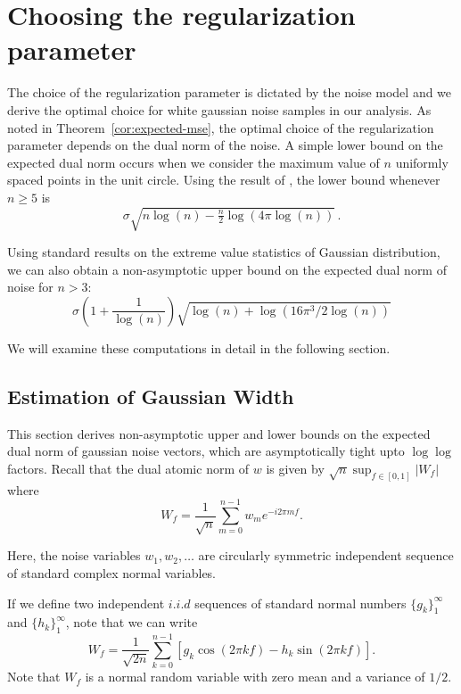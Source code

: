 \section{Choosing the regularization parameter}\label{subsec:parameter}
The choice of the regularization parameter is dictated by the noise model and we
derive the optimal choice for white gaussian noise samples in our analysis. As
noted in Theorem~\ref{cor:expected-mse}, the optimal choice of the
regularization parameter depends on the dual norm of the noise. A simple lower
bound on the expected dual norm occurs when we consider the maximum value of $n$
uniformly spaced points in the unit circle. Using the result of \cite{lr76}, the
lower bound whenever $n \geq 5$ is
\[
\sigma\sqrt{n\log(n) - \tfrac{n}{2} \log(4\pi\log(n))}\,.
\]

Using standard results on the extreme value statistics of Gaussian distribution,
we can also obtain a non-asymptotic upper bound on the expected dual norm of
noise for $n > 3$:
\[\sigma\left(1  + \frac{1}{\log(n)}\right)\sqrt{\log(n) + \log(16 \pi^3/2 \log(n))}\nonumber
\]

We will examine these computations in detail in the following section.

\subsection{Estimation of Gaussian Width}
\label{proof:dual-norm-bounds}

This section derives non-asymptotic upper and lower bounds on the expected dual norm of gaussian noise vectors, which are asymptotically tight upto $\log\log$ factors. Recall that the dual atomic norm of $w$ is given by $\sqrt{n}\sup_{f \in [0,1]}|W_f|$ where
\begin{equation*}
\label{ranproc}
W_f = \frac{1}{\sqrt{n}}\sum_{m=0}^{n-1}{w_m e^{-i2 \pi m f}}.
\end{equation*}

Here, the noise variables $w_1, w_2, \ldots$ are circularly symmetric
independent sequence of standard complex normal variables.

If we define two independent $i.i.d$ sequences of standard normal numbers $\{
g_k\}_1^\infty$ and $\{h_k\}_1^\infty$, note that we can write
\begin{equation}
W_f = \frac{1}{\sqrt{2 n}} \sum_{k=0}^{n-1} \left[ g_k \cos(2 \pi k f) - h_k \sin(2\pi k f) \right].
\end{equation}
Note that $W_f$ is a normal random variable with zero mean and a variance of
$1/2$.

